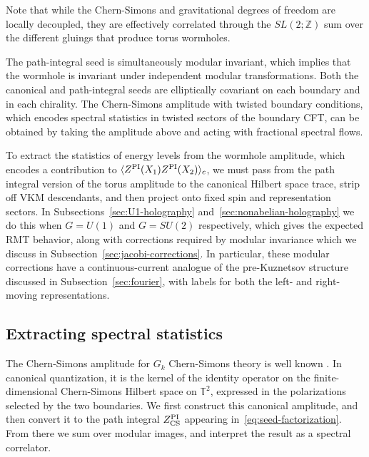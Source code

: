 \documentclass[11pt]{article}
\numberwithin{equation}{section}
\begin{document}
Note that while the Chern-Simons and gravitational degrees of freedom are locally decoupled, they are effectively correlated through the $SL(2;\mathbb{Z})$ sum over the different gluings that produce torus wormholes.

The path-integral seed is simultaneously modular invariant, which implies that the wormhole is invariant under independent modular transformations. Both the canonical and path-integral seeds are elliptically covariant on each boundary and in each chirality. The Chern-Simons amplitude with twisted boundary conditions, which encodes spectral statistics in twisted sectors of the boundary CFT, can be obtained by taking the amplitude above and acting with fractional spectral flows. 

To extract the statistics of energy levels from the wormhole amplitude, which encodes a contribution to $\langle Z^{\rm PI}(X_1)Z^{\rm PI}(X_2)\rangle_c$, we must pass from the path integral version of the torus amplitude to the canonical Hilbert space trace, strip off VKM descendants, and then project onto fixed spin and representation sectors. In Subsections~\ref{sec:U1-holography} and~\ref{sec:nonabelian-holography} we do this when $G=U(1)$ and $G=SU(2)$ respectively, which gives the expected RMT behavior, along with corrections required by modular invariance which we discuss in Subsection~\ref{sec:jacobi-corrections}. In particular, these modular corrections have a continuous-current analogue of the pre-Kuznetsov structure discussed in Subsection~\ref{sec:fourier}, with labels for both the left- and right-moving representations.

\subsection{Extracting spectral statistics}
\label{sec:CS-kernel}

The Chern-Simons amplitude for $G_k$ Chern-Simons theory is well known \cite{Witten:1988hf, Moore:1989yh, Elitzur:1989nr}. In canonical quantization, it is the kernel of the identity operator on the finite-dimensional Chern-Simons Hilbert space on $\mathbb{T}^2$, expressed in the polarizations selected by the two boundaries. We first construct this canonical amplitude, and then convert it to the path integral $Z_{\rm CS}^{\mathrm{PI}}$ appearing in~\eqref{eq:seed-factorization}. From there we sum over modular images, and interpret the result as a spectral correlator.
\end{document}
